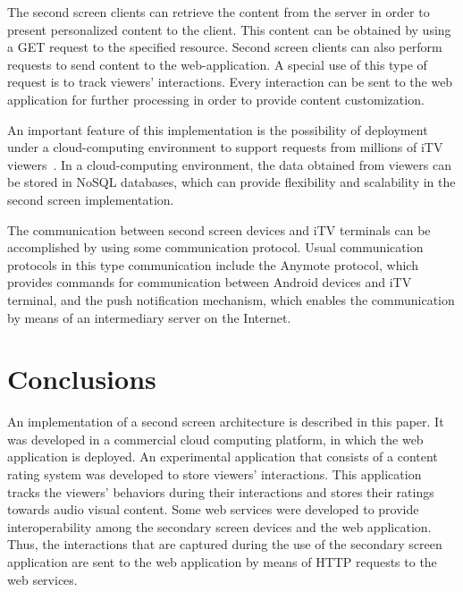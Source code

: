 \documentclass[journal]{IEEEtran}
\begin{document}
The second screen clients can retrieve the content from the server in order to present personalized content to the client. This content can be obtained by using a GET request to the specified resource. Second screen clients can also perform requests to send content to the web-application. A special use of this type of request is to track viewers' interactions. Every interaction can be sent to the web application for further processing in order to provide content customization.

An important feature of this implementation is the possibility of deployment under a cloud-computing environment to support requests from millions of iTV viewers~\cite{Lee2010}. In a cloud-computing environment, the data obtained from viewers can be stored in NoSQL databases, which can provide flexibility and scalability in the second screen implementation.

The communication between second screen devices and iTV terminals can be accomplished by using some communication protocol. Usual communication protocols in this type communication include the Anymote protocol, which provides commands for communication between Android devices and iTV terminal, and the push notification mechanism, which enables the communication by means of an intermediary server on the Internet.

\section{Conclusions}

An implementation of a second screen architecture is described in this paper. It was developed in a commercial cloud computing platform, in which the web application is deployed. An experimental application that consists of a content rating system was developed to store  viewers' interactions. This application tracks the viewers' behaviors during their interactions and stores their ratings towards audio visual content. Some web services were developed to provide interoperability among the secondary screen devices and the web application. Thus, the interactions that are captured during the use of the secondary screen application are sent to the web application by means of HTTP requests to the web services.



\end{document}
